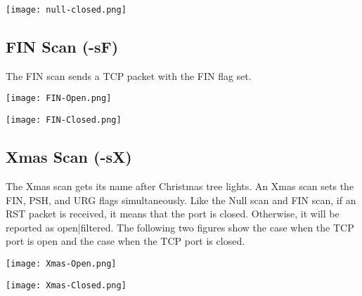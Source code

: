 \documentclass[11pt,a4paper]{article}
\begin{document}
\begin{center}
  \texttt{[image: null-closed.png]}
  \label{fig:null-closed}
\end{center}

\clearpage
\subsection{FIN Scan (-sF)}
The FIN scan sends a TCP packet with the FIN flag set.

\begin{center}
  \texttt{[image: FIN-Open.png]}
  \label{fig:FIN-Open}
\end{center}

\begin{center}
  \texttt{[image: FIN-Closed.png]}
  \label{fig:FIN-Closed}
\end{center}

\subsection{Xmas Scan (-sX)}
The Xmas scan gets its name after Christmas tree lights. An Xmas scan sets the FIN, PSH, and URG flags simultaneously. Like the Null scan and FIN scan, if an RST packet is received, it means that the port is closed. Otherwise, it will be reported as open|filtered. The following two figures show the case when the TCP port is open and the case when the TCP port is closed.

\begin{center}
  \texttt{[image: Xmas-Open.png]}
  \label{fig:Xmas-Open}
\end{center}

\begin{center}
  \texttt{[image: Xmas-Closed.png]}
  \label{fig:Xmas-Closed}
\end{center}
\end{document}
